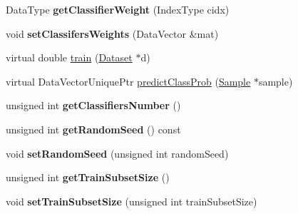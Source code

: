 \begin{DoxyCompactItemize}
\item 
\hypertarget{classffactory_1_1_weighted_bagging_classifier_afe71b3cafb89eb0d3591905983b3b4a1}{Data\-Type {\bfseries get\-Classifier\-Weight} (Index\-Type cidx)}\label{classffactory_1_1_weighted_bagging_classifier_afe71b3cafb89eb0d3591905983b3b4a1}

\item 
\hypertarget{classffactory_1_1_weighted_bagging_classifier_a1d08b3cf6e474cbc027e91b19cac25b5}{void {\bfseries set\-Classifers\-Weights} (Data\-Vector \&mat)}\label{classffactory_1_1_weighted_bagging_classifier_a1d08b3cf6e474cbc027e91b19cac25b5}

\item 
virtual double \hyperlink{classffactory_1_1_weighted_bagging_classifier_a9c083e5508f58695c569dd2a4df50fd3}{train} (\hyperlink{classffactory_1_1_dataset}{Dataset} $\ast$d)
\item 
virtual Data\-Vector\-Unique\-Ptr \hyperlink{classffactory_1_1_weighted_bagging_classifier_ae9653ff238505bd33cca67ed4e20513c}{predict\-Class\-Prob} (\hyperlink{classffactory_1_1_sample}{Sample} $\ast$sample)
\item 
\hypertarget{classffactory_1_1_weighted_bagging_classifier_a7662e0e6ad60d325a04199ba7baa309c}{unsigned int {\bfseries get\-Classifiers\-Number} ()}\label{classffactory_1_1_weighted_bagging_classifier_a7662e0e6ad60d325a04199ba7baa309c}

\item 
\hypertarget{classffactory_1_1_weighted_bagging_classifier_a922f0fd0eae4cd2cbae28b2ced7ee859}{unsigned int {\bfseries get\-Random\-Seed} () const }\label{classffactory_1_1_weighted_bagging_classifier_a922f0fd0eae4cd2cbae28b2ced7ee859}

\item 
\hypertarget{classffactory_1_1_weighted_bagging_classifier_a7388a4585bf360bd12571277f5de9014}{void {\bfseries set\-Random\-Seed} (unsigned int random\-Seed)}\label{classffactory_1_1_weighted_bagging_classifier_a7388a4585bf360bd12571277f5de9014}

\item 
\hypertarget{classffactory_1_1_weighted_bagging_classifier_a3c7818243bdbdb1227dbf4d6bfc89f7c}{unsigned int {\bfseries get\-Train\-Subset\-Size} ()}\label{classffactory_1_1_weighted_bagging_classifier_a3c7818243bdbdb1227dbf4d6bfc89f7c}

\item 
\hypertarget{classffactory_1_1_weighted_bagging_classifier_a05b054bf4d03977fc7a3cfdb156a7d94}{void {\bfseries set\-Train\-Subset\-Size} (unsigned int train\-Subset\-Size)}\label{classffactory_1_1_weighted_bagging_classifier_a05b054bf4d03977fc7a3cfdb156a7d94}

\end{DoxyCompactItemize}
